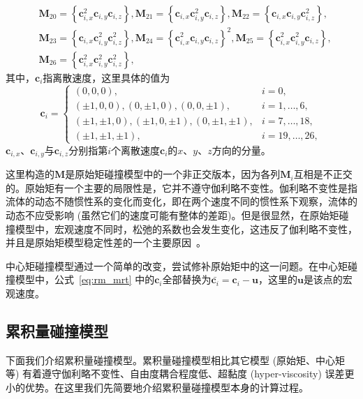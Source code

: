 \begin{align*}
    & \boldsymbol{M}_{20}=\left\{\boldsymbol{c}_{i, x}^2 \boldsymbol{c}_{i, y} \boldsymbol{c}_{i, z}\right\}, \boldsymbol{M}_{21}=\left\{\boldsymbol{c}_{i, x} \boldsymbol{c}_{i, y}^2 \boldsymbol{c}_{i, z}\right\}, \boldsymbol{M}_{22}=\left\{\boldsymbol{c}_{i, x} \boldsymbol{c}_{i, y} \boldsymbol{c}_{i, z}^2\right\}, \\
    & \boldsymbol{M}_{23}=\left\{\boldsymbol{c}_{i, x} \boldsymbol{c}_{i, y}^2 \boldsymbol{c}_{i, z}^2\right\}, \boldsymbol{M}_{24}=\left\{\boldsymbol{c}_{i, x}^2 \boldsymbol{c}_{i, y} \boldsymbol{c}_{i, z}\right\}^2, \boldsymbol{M}_{25}=\left\{\boldsymbol{c}_{i, x}^2 \boldsymbol{c}_{i, y}^2 \boldsymbol{c}_{i, z}\right\}, \\
    & \boldsymbol{M}_{26}=\left\{\boldsymbol{c}_{i, x}^2 \boldsymbol{c}_{i, y}^2 \boldsymbol{c}_{i, z}^2\right\},
\end{align*}
其中，$\boldsymbol{c}_{i}$指离散速度，这里具体的值为
\begin{equation}
    \boldsymbol{c}_i= \begin{cases}(0,0,0), & i=0, \\
        ( \pm 1,0,0),(0, \pm 1,0),(0,0, \pm 1), & i=1, \ldots, 6, \\
        ( \pm 1, \pm 1,0),( \pm 1,0, \pm 1),(0, \pm 1, \pm 1), & i=7, \ldots, 18, \\
        ( \pm 1, \pm 1, \pm 1), & i=19, \ldots, 26,\end{cases}
\end{equation}
$\boldsymbol{c}_{i, x}$、$\boldsymbol{c}_{i, y}$与$\boldsymbol{c}_{i, z}$分别指第$i$个离散速度$\boldsymbol{c}_{i}$的$x$、$y$、$z$方向的分量。

这里构造的$\mathbf{M}$是原始矩碰撞模型中的一个非正交版本，因为各列$\mathbf{M}_{i}$互相是不正交的。原始矩有一个主要的局限性是，它并不遵守伽利略不变性。伽利略不变性是指流体的动态不随惯性系的变化而变化，即在两个速度不同的惯性系下观察，流体的动态不应受影响 (虽然它们的速度可能有整体的差距)。但是很显然，在原始矩碰撞模型中，宏观速度不同时，松弛的系数也会发生变化，这违反了伽利略不变性，并且是原始矩模型稳定性差的一个主要原因~\citep{PhysRevE.95.013310}。

中心矩碰撞模型通过一个简单的改变，尝试修补原始矩中的这一问题。在中心矩碰撞模型中，公式~\ref{eq:rm_mrt} 中的$\boldsymbol{c}_{i}$全部替换为$\bar{\boldsymbol{c}_{i}}=\boldsymbol{c}_{i}-\boldsymbol{u}$，这里的$\boldsymbol{u}$是该点的宏观速度。

\subsection{累积量碰撞模型}
\label{sec:cumulant}
下面我们介绍累积量碰撞模型。累积量碰撞模型相比其它模型 (原始矩、中心矩等) 有着遵守伽利略不变性、自由度耦合程度低、超黏度 (hyper-viscosity) 误差更小的优势。在这里我们先简要地介绍累积量碰撞模型本身的计算过程。

